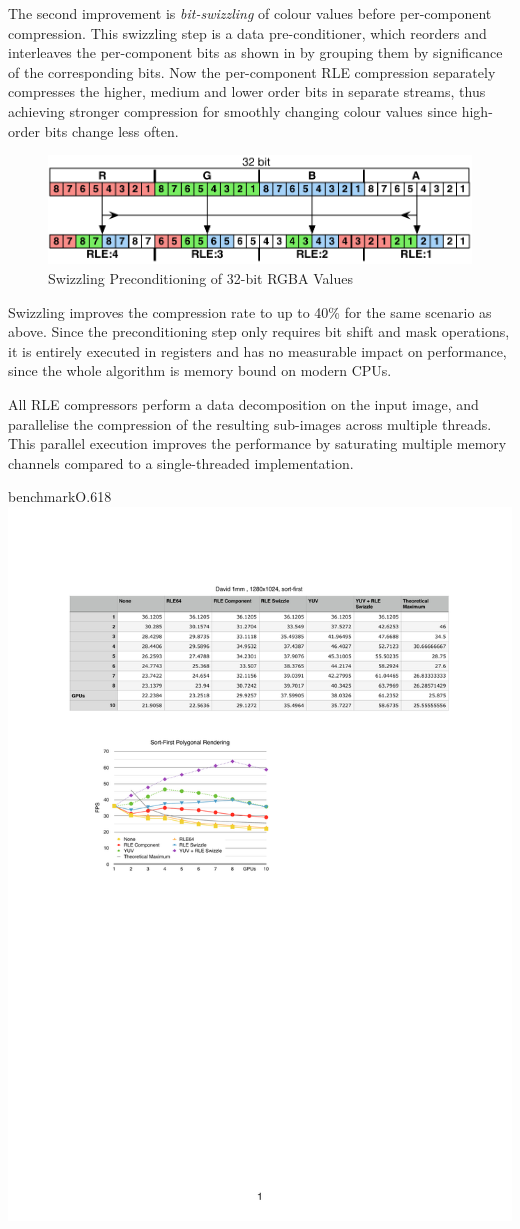 The second improvement is {\em bit-swizzling} of colour values before
per-component compression. This swizzling step is a data pre-conditioner, which
reorders and interleaves the per-component bits as shown in  by
grouping them by significance of the corresponding bits. Now the per-component
RLE compression separately compresses the higher, medium and lower order bits
in separate streams, thus achieving stronger compression for smoothly changing
colour values since high-order bits change less often.

\begin{figure}[h!t]
  \centering
  \includegraphics[width=\textwidth]{images/swizzle}
  \caption{Swizzling Preconditioning of 32-bit RGBA Values}
  \label{fSwizzle}
\end{figure}

Swizzling improves the compression rate to up to 40\% for the same scenario as
above. Since the preconditioning step only requires bit shift and mask
operations, it is entirely executed in registers and has no measurable
impact on performance, since the whole algorithm is memory bound on modern CPUs.

All RLE compressors perform a data decomposition on the input image, and
parallelise the compression of the resulting sub-images across multiple
threads. This parallel execution improves the performance by saturating
multiple memory channels compared to a single-threaded implementation.

\begin{wrapfloat}{benchmark}{O}{.618\textwidth}
  \includegraphics[width=.618\textwidth]{results/rle}
  \caption{Image Compression in Sort-First Polygonal Rendering}
  \label{rRLE}
\end{wrapfloat}

